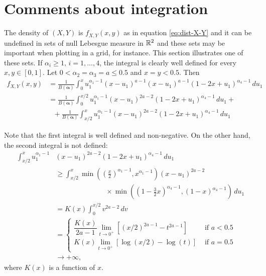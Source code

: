 \section{Comments about integration}

The density of $(X,Y)$ is $f_{X,Y}(x,y)$ as in equation \eqref{eq:dist-X-Y} and it can be undefined in sets of null Lebesgue measure in $\mathbb{R}^2$ and these sets may be important when plotting in a grid, for instance. This section illustrates one of these sets. If $\alpha_i \ge 1,
\, i = 1,...,4$, the integral is clearly well defined for every $x,y \in [0,1]$. Let $0 < \alpha_2 = \alpha_3 = a \le 0.5$ and $x = y < 0.5$. Then
\begin{equation*}
  \begin{split}
    f_{X,Y}(x,y) &= \frac{1}{B(\boldsymbol{\alpha})}\int_{0}^x u_1^{\alpha_1-1}(x-u_1)^{a-1}(x-u_1)^{a-1}(1-2x+u_1)^{\alpha_4-1} \, du_1 \\
    &= \frac{1}{B(\boldsymbol{\alpha})}\int_{0}^{x/2} u_1^{\alpha_1-1}(x-u_1)^{2a-2}(1-2x+u_1)^{\alpha_4-1} \, du_1 + \\
    &~~~+ \frac{1}{B(\boldsymbol{\alpha})}\int_{x/2}^x u_1^{\alpha_1-1}(x-u_1)^{2a-2}(1-2x+u_1)^{\alpha_4-1} \, du_1
  \end{split}
\end{equation*}

Note that the first integral is well defined and non-negative. On the other hand, the second integral is not defined: 
\begin{equation*}
  \begin{split}
    \int_{x/2}^{x} u_1^{\alpha_1-1}&(x-u_1)^{2a-2}(1-2x+u_1)^{\alpha_4-1} \, du_1 \\
    &\ge \int_{x/2}^x \min\left(\left(\frac{x}{2}\right)^{\alpha_1-1}, x^{\alpha_1-1}\right)(x-u_1)^{2a-2} \\ 
    &\hspace{3cm} \times \min\left(\left(1-\frac{3}{2}x\right)^{\alpha_4-1}, (1-x)^{\alpha_4-1}\right) \, du_1 \\
    &= K(x) \int_{0}^{x/2} v^{2a-2} \, dv \\ 
    &= \begin{cases}
      \dfrac{K(x)}{2a-1} \lim_{t \to 0^+} \left[(x/2)^{2a-1} - t^{2a-1}\right] &\text{ if } a < 0.5 \\ 
      K(x) \lim_{t \to 0^+} \left[\log(x/2) - \log(t)\right] &\text{ if } a = 0.5
    \end{cases} \\
    &\to +\infty, 
  \end{split}
\end{equation*}
where $K(x)$ is a function of $x$. 

